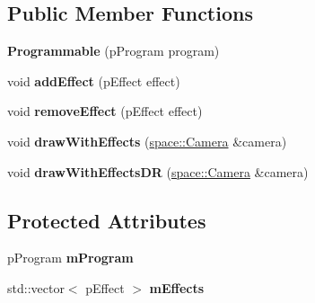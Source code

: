 \subsection*{Public Member Functions}
\begin{DoxyCompactItemize}
\item 
\hypertarget{classfillwave_1_1models_1_1Programmable_a520e03e2b51827974cf0fb6039f36b49}{}{\bfseries Programmable} (p\+Program program)\label{classfillwave_1_1models_1_1Programmable_a520e03e2b51827974cf0fb6039f36b49}

\item 
\hypertarget{classfillwave_1_1models_1_1Programmable_a6ca47b64fd46f77bf057303ecb809018}{}void {\bfseries add\+Effect} (p\+Effect effect)\label{classfillwave_1_1models_1_1Programmable_a6ca47b64fd46f77bf057303ecb809018}

\item 
\hypertarget{classfillwave_1_1models_1_1Programmable_a2cbf113ff69ad5d6ea9e8692ae882ae8}{}void {\bfseries remove\+Effect} (p\+Effect effect)\label{classfillwave_1_1models_1_1Programmable_a2cbf113ff69ad5d6ea9e8692ae882ae8}

\item 
\hypertarget{classfillwave_1_1models_1_1Programmable_a5d016e38d4db7e054ef13e782113fd55}{}void {\bfseries draw\+With\+Effects} (\hyperlink{classfillwave_1_1space_1_1Camera}{space\+::\+Camera} \&camera)\label{classfillwave_1_1models_1_1Programmable_a5d016e38d4db7e054ef13e782113fd55}

\item 
\hypertarget{classfillwave_1_1models_1_1Programmable_aef956730817bc24a30c349159582c451}{}void {\bfseries draw\+With\+Effects\+D\+R} (\hyperlink{classfillwave_1_1space_1_1Camera}{space\+::\+Camera} \&camera)\label{classfillwave_1_1models_1_1Programmable_aef956730817bc24a30c349159582c451}

\end{DoxyCompactItemize}
\subsection*{Protected Attributes}
\begin{DoxyCompactItemize}
\item 
\hypertarget{classfillwave_1_1models_1_1Programmable_a01ee220b405cf3fda76eebf5ab4755c9}{}p\+Program {\bfseries m\+Program}\label{classfillwave_1_1models_1_1Programmable_a01ee220b405cf3fda76eebf5ab4755c9}

\item 
\hypertarget{classfillwave_1_1models_1_1Programmable_a1265f84871a8e264a07e073282cee66d}{}std\+::vector$<$ p\+Effect $>$ {\bfseries m\+Effects}\label{classfillwave_1_1models_1_1Programmable_a1265f84871a8e264a07e073282cee66d}

\end{DoxyCompactItemize}



